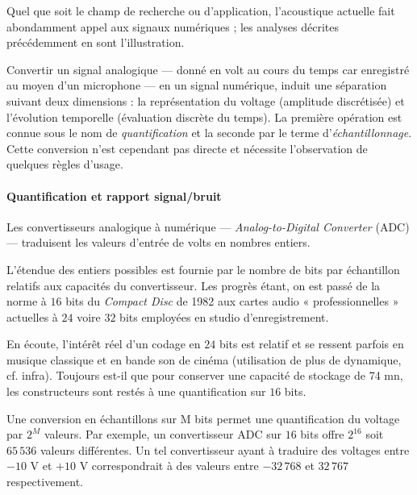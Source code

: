 
Quel que soit le champ de recherche ou d'application, l'acoustique actuelle fait abondamment appel aux signaux numériques ; les analyses décrites précédemment en sont l'illustration.

Convertir un signal analogique --- donné en volt au cours du temps car enregistré au moyen d'un microphone --- en un signal numérique, induit une séparation suivant deux dimensions : la représentation du voltage (amplitude discrétisée) et l'évolution temporelle (évaluation discrète du temps). La première opération est connue sous le nom de \emph{quantification} et la seconde par le terme d'\emph{échantillonnage}.
Cette conversion n'est cependant pas directe et nécessite l'observation de quelques règles d'usage.

\paragraph{Quantification et rapport signal/bruit} Les convertisseurs analogique à numérique --- \textit{Analog-to-Digital Converter} (ADC) --- traduisent les valeurs d'entrée de volts en nombres entiers. 

%
L'étendue des entiers possibles est fournie par le nombre de bits par échantillon relatifs aux capacités du convertisseur. Les progrès étant, on est passé de la norme à $16$ bits du \textit{Compact Disc} de 1982 aux cartes audio « professionnelles » actuelles à $24$ voire $32$ bits employées en studio d'enregistrement. 

En écoute, l'intérêt réel d'un codage en $24$ bits est relatif et se ressent parfois en musique classique et en bande son de cinéma (utilisation de plus de dynamique, cf. infra). Toujours est-il que pour conserver une capacité de stockage de 74 mn, les constructeurs sont restés à une quantification sur $16$ bits.

Une conversion en échantillons sur M bits permet une quantification du voltage par $2^M$ valeurs. Par exemple, un convertisseur ADC sur $16$ bits offre $2^{16}$ soit $65\,536$ valeurs différentes. Un tel convertisseur ayant à traduire des voltages entre $-10$ V et $+10$ V correspondrait à des valeurs entre $-32\,768$ et $32\,767$ respectivement.

